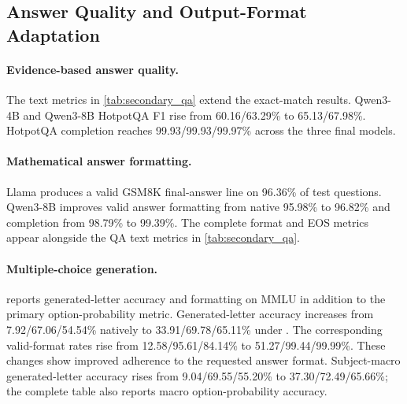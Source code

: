 \subsection{Answer Quality and Output-Format Adaptation}

\paragraph{Evidence-based answer quality.} The text metrics in \cref{tab:secondary_qa} extend the exact-match results. Qwen3-4B and Qwen3-8B HotpotQA F1 rise from 60.16/63.29\% to 65.13/67.98\%. HotpotQA completion reaches 99.93/99.93/99.97\% across the three final models.

\paragraph{Mathematical answer formatting.} Llama produces a valid GSM8K final-answer line on 96.36\% of test questions. Qwen3-8B improves valid answer formatting from native 95.98\% to 96.82\% and completion from 98.79\% to 99.39\%. The complete format and EOS metrics appear alongside the QA text metrics in \cref{tab:secondary_qa}.

\begin{table}[!htbp]
  \centering
  \caption{\textbf{Secondary answer-quality and completion metrics.} HotpotQA uses its 7,405-example validation split; GSM8K uses its 1,319-example test split. HotpotQA text EM and F1 use accepted normalized aliases, and completion records EOS within the generation budget. GSM8K valid format requires a parsable final \texttt{\#\#\#\# NUMBER} line. Values are percentages averaged across three recorded runs; Native is measured once.}
  \label{tab:secondary_qa}
  \small\setlength{\tabcolsep}{4pt}
  
\end{table}

\paragraph{Multiple-choice generation.}  reports generated-letter accuracy and formatting on MMLU in addition to the primary option-probability metric. Generated-letter accuracy increases from 7.92/67.06/54.54\% natively to 33.91/69.78/65.11\% under \method. The corresponding valid-format rates rise from 12.58/95.61/84.14\% to 51.27/99.44/99.99\%. These changes show improved adherence to the requested answer format. Subject-macro generated-letter accuracy rises from 9.04/69.55/55.20\% to 37.30/72.49/65.66\%; the complete table also reports macro option-probability accuracy.


